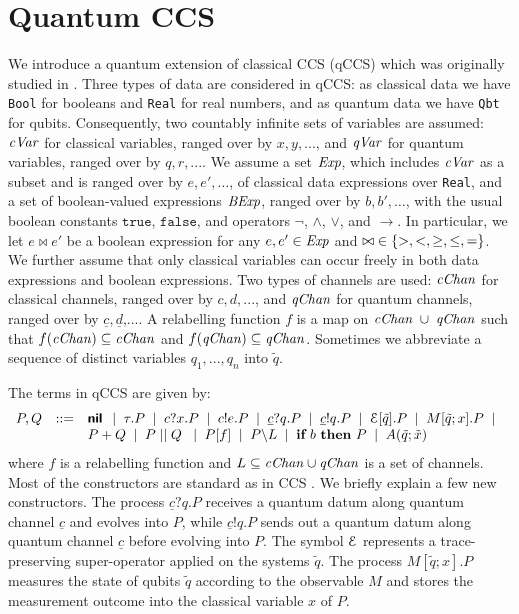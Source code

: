 \documentclass[a4paper,UKenglish,cleveref, autoref]{lipics-v2019}
\def\ra{\ensuremath{\rightarrow}}
\newcommand{\qc}{\underline{c}}
\newcommand{\qd}{\underline{d}}
\newcommand{\cVar}{{\it cVar}}
\newcommand{\qVar}{{\it qVar}}
\newcommand{\cChan}{{\it cChan}}
\newcommand{\qChan}{{\it qChan}}
\newcommand{\CE}{{\cal E}}
\newcommand{\ifthen}[2]{{\textbf{if} ~#1~ \textbf{then} ~#2}}
\begin{document}
\section{Quantum CCS}\label{sec:qccs}

We introduce a quantum extension of classical CCS (qCCS) which was originally studied in \cite{FDJY07,YFDJ09,FDY11}. Three types of data are considered in qCCS: as classical data we have \texttt{Bool} for booleans and \texttt{Real} for real numbers, and as quantum data we have \texttt{Qbt} for qubits. Consequently,
two countably infinite sets of variables are assumed: $\cVar$ for classical variables, ranged over by $x,y,...$, and $\qVar$ for quantum variables, ranged over by $q,r,...$.
We assume a set ${\it Exp}$, which includes $\cVar$ as a subset and is ranged over by $e,e',\dots$,  of classical data expressions over
\texttt{Real}, and a set of boolean-valued expressions ${\it BExp}$, ranged over by $b, b',\dots$, with the usual  boolean constants $\texttt{true}$, $\texttt{false}$, and operators
$\neg$, $\wedge$, $\vee$, and $\ra$. In particular, we let $e\bowtie e'$ be a boolean expression for any $e,e'\in {\it Exp}$ and ${\bowtie} \in\{ {>, <, \geq, \leq, =} \}$.
We further assume that only classical variables can occur freely in both data expressions and boolean expressions.
Two types of channels are used: $\cChan$ for classical channels, ranged over by $c,d,...$, and $\qChan$ for quantum channels, ranged over by $\qc,\qd$,.... A relabelling function $f$ is a map on $\cChan\; \cup\; \qChan$ such that $f(\cChan)\subseteq \cChan$ and $f(\qChan)\subseteq \qChan$.
Sometimes we abbreviate a sequence of distinct variables $q_1,...,q_n$ into $\tilde{q}$.

The terms in qCCS are given by:
\[\begin{array}{rcl}
P,Q &::=& \Cnil \BNFsep \tau.P \BNFsep c?x.P \BNFsep c!e.P
\BNFsep \qc?q.P \BNFsep
\qc!q.P \BNFsep \CE[\tilde{q}].P
\BNFsep M[\tilde{q};x].P \BNFsep \\
& & P + Q \BNFsep  P \Cpar Q\;
\BNFsep P[f] \BNFsep P\backslash L \BNFsep \ifthen{b}{P} \BNFsep
A(\tilde{q};\tilde{x})
\end{array}\]
where $f$ is a relabelling function and $L\subseteq \cChan\cup \qChan$ is a set of channels.
Most of the constructors are standard as in CCS \cite{ccs}.
We briefly explain a few new constructors. The process $\qc?q.P$ receives a quantum datum along quantum channel $\qc$ and evolves into $P$, while $\qc!q.P$ sends out a quantum datum along quantum channel $\qc$ before evolving into $P$. The symbol $\CE$ represents a trace-preserving super-operator applied on the systems $\tilde{q}$. The process $M[\widetilde{q};x].P$ measures the state of qubits $\widetilde{q}$
according to the observable $M$ and stores the measurement outcome into the
classical variable $x$ of $P$.
\end{document}
